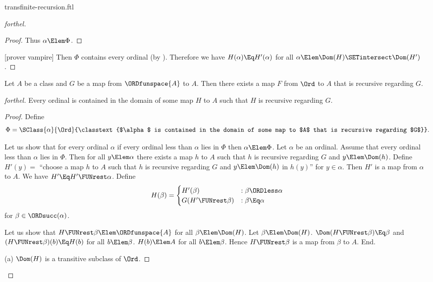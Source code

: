 \documentclass{stex}
\begin{document}
\begin{smodule}{transfinite-recursion.ftl}
\begin{proof}[forthel]
\begin{proof}
    Thus $\alpha \Elem \Phi$.
  \end{proof}

  [prover vampire]
  Then $\Phi$ contains every ordinal (by ).
  Therefore we have $H(\alpha) \Eq H'(\alpha)$ for all $\alpha \Elem \Dom(H) \SETintersect \Dom(H')$.
\end{proof}

\begin{theorem}[forthel,title=Transfinite Recursion Theorem: Existence,id=transfinite_recursion_existence]
  Let $A$ be a class and $G$ be a map from $\ORDfunspace{A}$ to $A$.
  Then there exists a map $F$ from $\Ord$ to $A$ that is recursive regarding $G$.
\end{theorem}
\begin{proof}[forthel]
  Every ordinal is contained in the domain of some map $H$ to $A$ such that $H$ is recursive regarding $G$.
  \begin{proof}
    Define \[ \Phi = \SClass{\alpha}{\Ord}{\classtext{$\alpha$ is contained in the domain of some map to $A$ that is recursive regarding $G$}}. \]

    Let us show that for every ordinal $\alpha$ if every ordinal less than $\alpha$ lies in $\Phi$ then $\alpha \Elem \Phi$.
      Let $\alpha$ be an ordinal.
      Assume that every ordinal less than $\alpha$ lies in $\Phi$.
      Then for all $y \Elem \alpha$ there exists a map $h$ to $A$ such that $h$ is recursive regarding $G$ and $y \Elem \Dom(h)$.
      Define $H'(y) =$ ``choose a map $h$ to $A$ such that $h$ is recursive regarding $G$ and $y \Elem \Dom(h)$ in $h(y)$'' for $y \in \alpha$.
      Then $H'$ is a map from $\alpha$ to $A$.
      We have $H' \Eq H' \FUNrest \alpha$.
      Define \[ H(\beta) =
        \begin{cases}
          H'(\beta)                 & : \beta \ORDless \alpha \\
          G(H' \FUNrest \beta)  & : \beta \Eq \alpha
        \end{cases} \]
      for $\beta \in \ORDsucc(\alpha)$.
      
      Let us show that $H \FUNrest \beta \Elem \ORDfunspace{A}$ for all $\beta \Elem \Dom(H)$.
        Let $\beta \Elem \Dom(H)$.
        $\Dom(H \FUNrest \beta) \Eq \beta$ and $(H \FUNrest \beta)(b) \Eq H(b)$ for all $b \Elem \beta$.
        $H(b) \Elem A$ for all $b \Elem \beta$.
        Hence $H \FUNrest \beta$ is a map from $\beta$ to $A$.
      End.

      (a) $\Dom(H)$ is a transitive subclass of $\Ord$.


\end{proof}
\end{proof}
\end{smodule}
\end{document}
